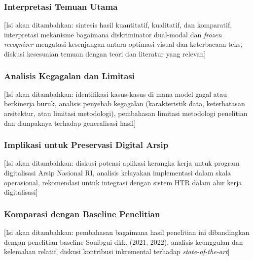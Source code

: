 \documentclass[12pt,a4paper]{article}
\begin{document}
\subsubsection{Interpretasi Temuan Utama}
\label{subsubsec:interpretasi-temuan}

[Isi akan ditambahkan: sintesis hasil kuantitatif, kualitatif, dan komparatif, interpretasi mekanisme bagaimana diskriminator dual-modal dan \textit{frozen recognizer} mengatasi kesenjangan antara optimasi visual dan keterbacaan teks, diskusi kesesuaian temuan dengan teori dan literatur yang relevan]

\vspace{0.8em}

\subsubsection{Analisis Kegagalan dan Limitasi}
\label{subsubsec:analisis-kegagalan}

[Isi akan ditambahkan: identifikasi kasus-kasus di mana model gagal atau berkinerja buruk, analisis penyebab kegagalan (karakteristik data, keterbatasan arsitektur, atau limitasi metodologi), pembahasan limitasi metodologi penelitian dan dampaknya terhadap generalisasi hasil]

\vspace{0.8em}

\subsubsection{Implikasi untuk Preservasi Digital Arsip}
\label{subsubsec:implikasi-praktis}

[Isi akan ditambahkan: diskusi potensi aplikasi kerangka kerja untuk program digitalisasi Arsip Nasional RI, analisis kelayakan implementasi dalam skala operasional, rekomendasi untuk integrasi dengan sistem HTR dalam alur kerja digitalisasi]

\vspace{0.8em}

\subsubsection{Komparasi dengan Baseline Penelitian}
\label{subsubsec:komparasi-baseline}

[Isi akan ditambahkan: pembahasan bagaimana hasil penelitian ini dibandingkan dengan penelitian baseline Souibgui dkk. (2021, 2022), analisis keunggulan dan kelemahan relatif, diskusi kontribusi inkremental terhadap \textit{state-of-the-art}]
\end{document}
